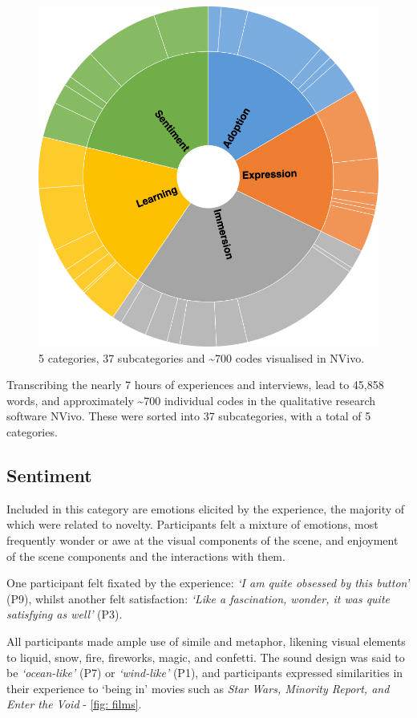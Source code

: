 \begin{figure}
    \centering
    \includegraphics[width=0.7\linewidth]{figures/06-polaris/polaris-feedback-grounded-codes.png}
    \caption{5 categories, 37 subcategories and \textasciitilde{}700 codes visualised in NVivo.}
    \label{fig: polaris-feedback-grounded-codes}
\end{figure}

Transcribing the nearly 7 hours of experiences and interviews, lead to 45,858 words, and approximately \textasciitilde{}700 individual codes in the qualitative research software NVivo. These were sorted into 37 subcategories, with a total of 5 categories.

\subsection{Sentiment}\label{sec: polaris-feedback-sentiment}
Included in this category are emotions elicited by the experience, the majority of which were related to novelty. Participants felt a mixture of emotions, most frequently wonder or awe at the visual components of the scene, and enjoyment of the scene components and the interactions with them.

One participant felt fixated by the experience: \textit{`I am quite obsessed by this button'} (P9), whilst another felt satisfaction: \textit{`Like a fascination, wonder, it was quite satisfying as well'} (P3).

All participants made ample use of simile and metaphor, likening visual elements to liquid, snow, fire, fireworks, magic, and confetti. The sound design was said to be \textit{`ocean-like'} (P7) or \textit{`wind-like'} (P1), and participants expressed similarities in their experience to `being in' movies such as \textit{Star Wars, Minority Report, and Enter the Void} - \autoref{fig: films}.

